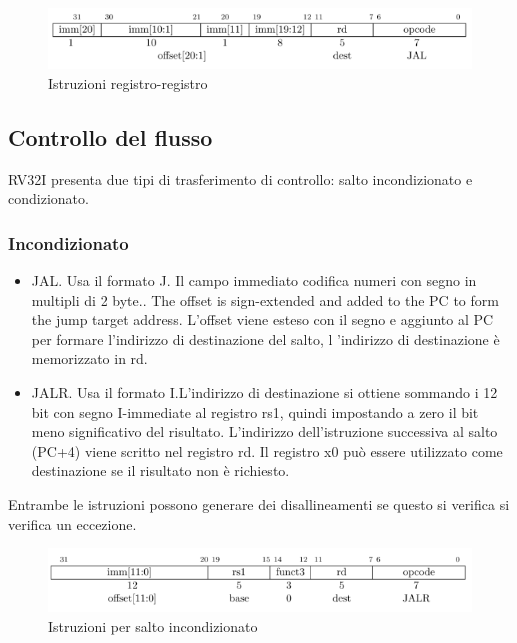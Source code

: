 \documentclass[12pt,a4paper]{report}
\begin{document}
\begin{figure}
	\includegraphics[width = \textwidth]{Istruzioni/Istruction4.png}
	\caption{Istruzioni registro-registro}
		\label{Fig:Istruzioni_rr}
\end{figure}

\subsection{Controllo del flusso}
RV32I presenta due tipi di trasferimento di controllo: salto incondizionato e condizionato.
\subsubsection{Incondizionato}
\begin{itemize}
	\item JAL. Usa  il formato J. Il campo immediato codifica numeri con segno in multipli di 2 byte.. The offset is sign-extended and added to the PC to form the jump target address. L'offset viene esteso con il segno e aggiunto al PC per formare l'indirizzo di destinazione del salto, l 'indirizzo di destinazione è memorizzato in rd.
	\item JALR. Usa il formato I.L'indirizzo di destinazione si ottiene sommando i 12 bit con segno I-immediate al registro rs1, quindi impostando a zero il bit meno significativo del risultato. L'indirizzo dell'istruzione successiva al salto (PC+4) viene scritto nel registro rd. Il registro x0 può essere utilizzato come destinazione se il risultato non è richiesto.
\end{itemize}
Entrambe le istruzioni possono generare dei disallineamenti se questo si verifica si verifica un eccezione.

\begin{figure}
	\includegraphics[width = \textwidth]{Istruzioni/Istruction5.png}
	\caption{Istruzioni per salto incondizionato}
	\label{Fig:Istruzioni_saltoIncondizionato}
\end{figure}
\end{document}
